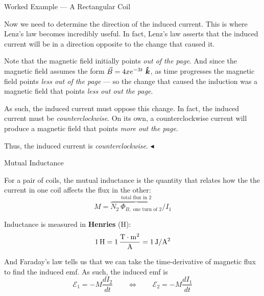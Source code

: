 \documentclass{beamer}
\begin{document}
\begin{frame}{Worked Example --- A Rectangular Coil}

Now we need to determine the direction of the induced current. This is where Lenz's law becomes incredibly useful. In fact, Lenz's law asserts that the induced current will be in a direction opposite to the change that caused it.

\vfill

Note that the magnetic field initially points \emph{out of the page}. And since the magnetic field assumes the form $\vec{B} = 4x e^{-3t}\ \bm{\hat{k}}$, as time progresses the magnetic field points \emph{less out of the page} --- so the change that caused the induction was a magnetic field that points \emph{less out out the page}.

\vfill

As such, the induced current must oppose this change. In fact, the induced current must be \emph{counterclockwise}. On its own, a counterclockwise current will produce a magnetic field that points \emph{more out the page}.

\vfill

Thus, the induced current is \emph{counterclockwise}. $\blacktriangleleft$

\end{frame}

\begin{frame}{Mutual Inductance}

For a pair of coils, the mutual inductance is the quantity that relates how the the current in one coil affects the flux in the other:
\begin{equation*}
    M = \overbrace{N_2\ \Phi_{B, \text{ one turn of 2}}}^{\text{total flux in 2}} / I_1
\end{equation*}

Inductance is measured in \textbf{Henries} (H):
\begin{equation*}
\SI{1}{\henry} = \SI{1}{\frac{\tesla\cdot\metre^2}{\ampere}} = \SI{1}{\joule/\ampere^2}
\end{equation*}

And Faraday's law tells us that we can take the time-derivative of magnetic flux to find the induced emf. As such, the induced emf is
\begin{equation*}
    \mathcal{E}_1 = -M \frac{dI_2}{dt} \qquad \Longleftrightarrow \qquad \mathcal{E}_2 = -M \frac{dI_1}{dt}
\end{equation*}

\end{frame}
\end{document}
